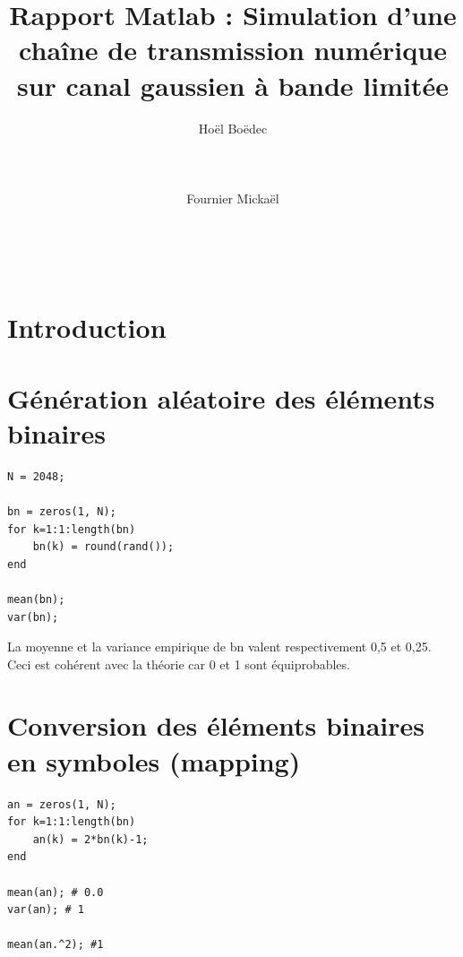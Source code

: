 \documentclass{acm_proc_article-sp}
\begin{document}
\title{Rapport Matlab : Simulation d'une chaîne de transmission numérique sur canal gaussien à bande limitée}

\author{
\alignauthor
Hoël Boëdec\\
       \\
       \\
       \\
\alignauthor
Fournier Mickaël\\
       \\
       \\
       \\
}

\maketitle
\begin{abstract}
    
\end{abstract}


\section{Introduction}

\section{Génération aléatoire des éléments binaires}
\begin{lstlisting}
N = 2048;

bn = zeros(1, N);
for k=1:1:length(bn)
    bn(k) = round(rand());
end

mean(bn);
var(bn);
\end{lstlisting}
La moyenne et la variance empirique de bn valent respectivement 0,5 et 0,25. Ceci est cohérent avec la théorie car 0 et 1 sont équiprobables.


\section{Conversion des éléments binaires en symboles (mapping)}
\begin{lstlisting}
an = zeros(1, N);
for k=1:1:length(bn)
    an(k) = 2*bn(k)-1;
end

mean(an); # 0.0
var(an); # 1

mean(an.^2); #1
\end{lstlisting}
\end{document}
